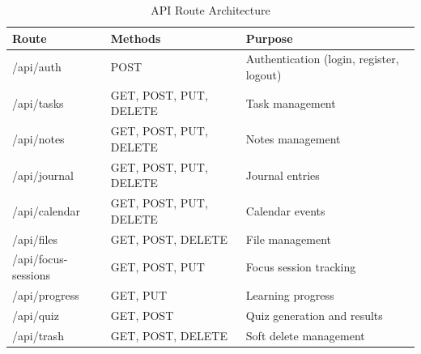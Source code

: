     \begin{table}[H]
    \centering
    \begin{tabular}{|p{4cm}|p{5cm}|p{4.5cm}|}
    \hline
    \textbf{Route} & \textbf{Methods} & \textbf{Purpose} \\
    \hline
    /api/auth & POST & Authentication (login, register, logout) \\
    \hline
    /api/tasks & GET, POST, PUT, DELETE & Task management \\
    \hline
    /api/notes & GET, POST, PUT, DELETE & Notes management \\
    \hline
    /api/journal & GET, POST, PUT, DELETE & Journal entries \\
    \hline
    /api/calendar & GET, POST, PUT, DELETE & Calendar events \\
    \hline
    /api/files & GET, POST, DELETE & File management \\
    \hline
    /api/focus-sessions & GET, POST, PUT & Focus session tracking \\
    \hline
    /api/progress & GET, PUT & Learning progress \\
    \hline
    /api/quiz & GET, POST & Quiz generation and results \\
    \hline
    /api/trash & GET, POST, DELETE & Soft delete management \\
    \hline
    \end{tabular}
    \caption{API Route Architecture}
    \end{table}
